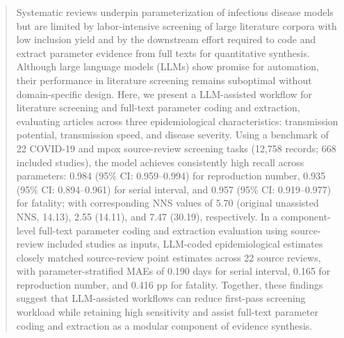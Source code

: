 \begin{abstract}
Systematic reviews underpin parameterization of infectious disease models but are limited by labor-intensive screening of large literature corpora with low inclusion yield and by the downstream effort required to code and extract parameter evidence from full texts for quantitative synthesis. Although large language models (LLMs) show promise for automation, their performance in literature screening remains suboptimal without domain-specific design. Here, we present a LLM-assisted workflow for literature screening and full-text parameter coding and extraction, evaluating articles across three epidemiological characteristics: transmission potential, transmission speed, and disease severity. Using a benchmark of 22 COVID-19 and mpox source-review screening tasks (12,758 records; 668 included studies), the model achieves consistently high recall across parameters: 0.984 (95\% CI: 0.959--0.994) for reproduction number, 0.935 (95\% CI: 0.894--0.961) for serial interval, and 0.957 (95\% CI: 0.919--0.977) for fatality; with corresponding NNS values of 5.70 (original unassisted NNS, 14.13), 2.55 (14.11), and 7.47 (30.19), respectively. In a component-level full-text parameter coding and extraction evaluation using source-review included studies as inputs, LLM-coded epidemiological estimates closely matched source-review point estimates across 22 source reviews, with parameter-stratified MAEs of 0.190 days for serial interval, 0.165 for reproduction number, and 0.416 pp for fatality.
Together, these findings suggest that LLM-assisted workflows can reduce first-pass screening workload while retaining high sensitivity and assist full-text parameter coding and extraction as a modular component of evidence synthesis.

\end{abstract}

